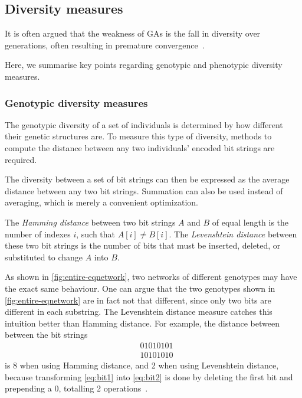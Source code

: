 \subsection{Diversity measures}
\label{sec:diversitymeasures}
It is often argued that the weakness of GAs is the fall in diversity over generations, often resulting in premature convergence~\cite{diaz2007empirical, 1266373,Zitzler00comparisonof}.

Here, we summarise key points regarding genotypic and phenotypic diversity measures. %

\subsubsection{Genotypic diversity measures}
The genotypic diversity of a set of individuals is determined by how different their genetic structures are. To measure this type of diversity, methods to compute the distance between any two individuals' encoded bit strings are required.

The diversity between a set of bit strings can then be expressed as the average distance between any two bit strings. Summation can also be used instead of averaging, which is merely a convenient optimization.

The \emph{Hamming distance} between two bit strings $A$ and $B$ of equal length is the number of indexes $i$, such that $A[i] \neq B[i]$. The \emph{Levenshtein distance} between these two bit strings is the number of bits that must be inserted, deleted, or substituted to change $A$ into $B$.

As shown in \cref{fig:entire-eqnetwork}, two networks of different genotypes may have the exact same behaviour. One can argue that the two genotypes shown in \cref{fig:entire-eqnetwork} are in fact not that different, since only two bits are different in each substring. The Levenshtein distance measure catches this intuition better than Hamming distance. For example, the distance between between the bit strings
%
\begin{align}
  &01010101\label{eq:bit1} \\
  &10101010\label{eq:bit2}
\end{align}
%
is 8 when using Hamming distance, and 2 when using Levenshtein distance, because transforming \cref{eq:bit1} into \cref{eq:bit2} is done by deleting the first bit and prepending a $0$, totalling 2 operations~\cite{1250187}.

